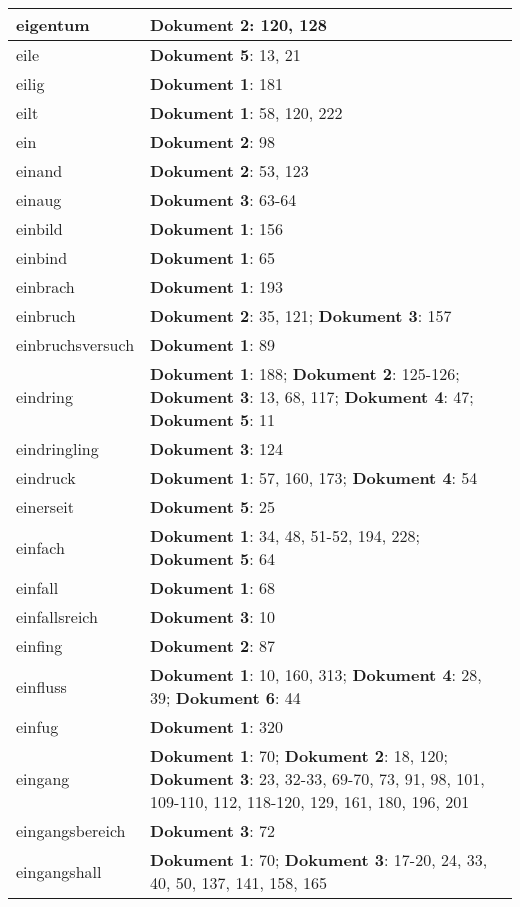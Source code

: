 \documentclass[a5paper]{article}
\begin{document}
\begin{longtable}[l]{|l|p{3in}|}
\hline
eigentum & \textbf{Dokument 2}: 120, 128 \\
\hline
eile & \textbf{Dokument 5}: 13, 21 \\
\hline
eilig & \textbf{Dokument 1}: 181 \\
\hline
eilt & \textbf{Dokument 1}: 58, 120, 222 \\
\hline
ein & \textbf{Dokument 2}: 98 \\
\hline
einand & \textbf{Dokument 2}: 53, 123 \\
\hline
einaug & \textbf{Dokument 3}: 63-64 \\
\hline
einbild & \textbf{Dokument 1}: 156 \\
\hline
einbind & \textbf{Dokument 1}: 65 \\
\hline
einbrach & \textbf{Dokument 1}: 193 \\
\hline
einbruch & \textbf{Dokument 2}: 35, 121; \textbf{Dokument 3}: 157 \\
\hline
einbruchsversuch & \textbf{Dokument 1}: 89 \\
\hline
eindring & \textbf{Dokument 1}: 188; \textbf{Dokument 2}: 125-126; \textbf{Dokument 3}: 13, 68, 117; \textbf{Dokument 4}: 47; \textbf{Dokument 5}: 11 \\
\hline
eindringling & \textbf{Dokument 3}: 124 \\
\hline
eindruck & \textbf{Dokument 1}: 57, 160, 173; \textbf{Dokument 4}: 54 \\
\hline
einerseit & \textbf{Dokument 5}: 25 \\
\hline
einfach & \textbf{Dokument 1}: 34, 48, 51-52, 194, 228; \textbf{Dokument 5}: 64 \\
\hline
einfall & \textbf{Dokument 1}: 68 \\
\hline
einfallsreich & \textbf{Dokument 3}: 10 \\
\hline
einfing & \textbf{Dokument 2}: 87 \\
\hline
einfluss & \textbf{Dokument 1}: 10, 160, 313; \textbf{Dokument 4}: 28, 39; \textbf{Dokument 6}: 44 \\
\hline
einfug & \textbf{Dokument 1}: 320 \\
\hline
eingang & \textbf{Dokument 1}: 70; \textbf{Dokument 2}: 18, 120; \textbf{Dokument 3}: 23, 32-33, 69-70, 73, 91, 98, 101, 109-110, 112, 118-120, 129, 161, 180, 196, 201 \\
\hline
eingangsbereich & \textbf{Dokument 3}: 72 \\
\hline
eingangshall & \textbf{Dokument 1}: 70; \textbf{Dokument 3}: 17-20, 24, 33, 40, 50, 137, 141, 158, 165 \\

\end{longtable}
\end{document}
